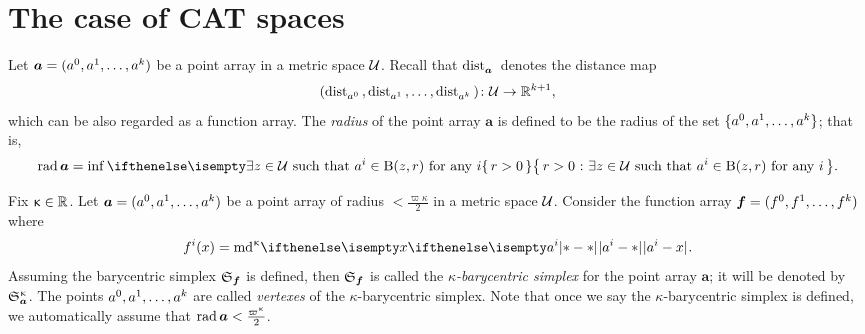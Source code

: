 \section{The case of CAT spaces}

Let $\bm{a}=(a^0,a^1,\dots,a^\kay)$ be a point array in a metric space $\mathcal{U}$.
Recall that 
$\mathop{\rm dist}\nolimits_{\bm{a}}^{{}}{}{}$
denotes the distance map
\[(\distfun{a^0}{}{},\distfun{a^1}{}{},\dots,\distfun{a^\kay}{}{})\:\spc{U}\to\RR^{\kay+1},\]
which can be also regarded as a function array.
The \emph{radius} of the point array $\bm{a}$ is defined to be the radius of the set $\{a^0,a^1,\dots,a^\kay\}$;
that is,
\[\rad\bm{a}=\inf\set{r>0}{\exists z\in\spc{U}\ \text{such that}\ a^i\in \oBall(z,r)\ \text{for any}\ i}.\]

Fix $\kappa\in\RR$.
Let $\bm{a}=(a^0,a^1,\dots,a^\kay)$ be a point array of radius $<\tfrac{\varpi\kappa}2$
in a metric space $\mathcal{U}$.
Consider the function array $\bm{f}=(f^0,f^1,\dots,f^\kay)$ 
where 
\[f^i(x)\z=\md\kappa\dist[{{}}]{a^i}{x}{}.\]
Assuming the barycentric simplex $\mathfrak{S}_{\bm{f}}$ is defined,
then $\mathfrak{S}_{\bm{f}}$ is called the \emph{$\kappa$-barycentric simplex} for the point array $\bm{a}$;
it will be denoted by $\mathfrak{S}_{\bm{a}}^{\upkappa}$.
The points $a^0,a^1,\dots,a^\kay$ are called 
\emph{vertexes} of the $\kappa$-barycentric simplex.
Note that once we say the $\kappa$-barycentric simplex is defined, 
we automatically assume that $\rad\bm{a}<\tfrac{\varpi\kappa}2$.


